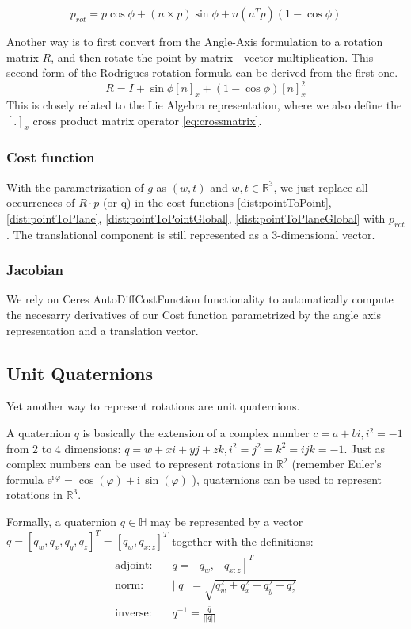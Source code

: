 \documentclass[12pt, a4paper]{article}
\begin{document}
\begin{equation}
p_{rot} = p \cos{\phi} + (n \times p) \sin{\phi} + n(n^Tp)(1 - \cos{\phi})
\end{equation}

Another way is to first convert from the Angle-Axis formulation to a rotation matrix $R$, and then rotate the point by matrix - vector multiplication. This second form of the Rodrigues rotation formula can be derived from the first one.
\[
R  = I + \sin{\phi} [n]_x + (1-\cos\phi) 	[n]_x^2
\]
This is closely related to the Lie Algebra representation, where we also define the $[.]_x$ cross product matrix operator \eqref{eq:crossmatrix}.

\subsubsection{Cost function}
With the parametrization of $g$ as $(w,t)$ and $w,t \in \mathbb{R}^3$, we just replace all occurrences of $R \cdot p$ (or q) in the cost functions \eqref{dist:pointToPoint}, \eqref{dist:pointToPlane}, \eqref{dist:pointToPointGlobal}, \eqref{dist:pointToPlaneGlobal} with $p_{rot}$. The translational component is still represented as a 3-dimensional vector.

\subsubsection{Jacobian}
We rely on Ceres AutoDiffCostFunction functionality to automatically compute the necesarry derivatives of our Cost function parametrized by the angle axis representation and a translation vector.



\subsection{Unit Quaternions}
Yet another way to represent rotations are unit quaternions.

A quaternion $q$ is basically the extension of a complex number $c=a+bi, i^2 = -1$ from 2 to 4 dimensions: $q = w + xi + yj + zk, i^2 = j^2 = k^2 = ijk = -1$. Just as complex numbers can be used to represent rotations in $\mathbb{R}^2$ (remember Euler's formula $\mathrm{e}^{\mathrm{i}\,\varphi} = \cos\left(\varphi \right) + \mathrm{i}\,\sin\left( \varphi\right)$ ), quaternions can be used to represent rotations in $\mathbb{R}^3$.

Formally, a quaternion $q \in \mathbb{H}$ may be represented by a vector $q = [q_w,q_x,q_y,q_z]^T = [q_w, q_{x:z}]^T$ together with the definitions:
\begin{align*}
	\text{adjoint}: & \quad \bar{q}= [q_w, -q_{x:z}]^T \\
	\text{norm}:	& \quad ||q|| = \sqrt{q_w^2+q_x^2+q_y^2+q_z^2} \\
	\text{inverse}:	& \quad q^{-1} = \frac{\bar{q}}{||q||}
\end{align*}
\end{document}
